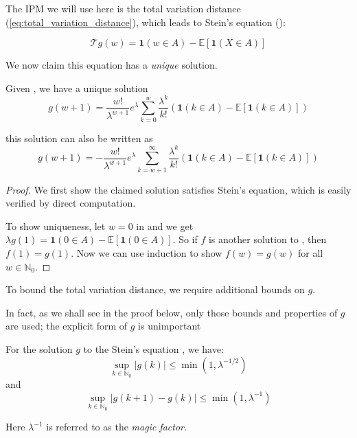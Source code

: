 \documentclass{article}
\begin{document}
The IPM we will use here is the total variation distance (\ref{eq:total_variation_distance}), which leads to Stein's equation ():

\begin{equation}
    \mathcal{T}g(w) = \mathbf{1}(w \in A) - \mathbb{E}[\mathbf{1}(X \in A)]
    \label{eq:poisson_stein_equation}
\end{equation}

We now claim this equation has a \textit{unique} solution.

\begin{lemma}\label{lem:poisson_stein_equation}
    Given , we have a unique solution
    \begin{equation}
        g(w+1) = \frac{w!}{\lambda^{w+1}} e^\lambda \sum_{k=0}^w \frac{\lambda^k}{k!} (\mathbf{1}(k\in A) - \mathbb{E}[\mathbf{1}(k\in A)])
    \end{equation}

    this solution can also be written as 
    \begin{equation}
        g(w+1) = -\frac{w!}{\lambda^{w+1}} e^\lambda \sum_{k=w+1}^\infty \frac{\lambda^k}{k!} (\mathbf{1}(k\in A) - \mathbb{E}[\mathbf{1}(k\in A)])
    \end{equation}
\end{lemma}

\begin{proof}
    We first show the claimed solution satisfies Stein's equation, which is easily verified by direct computation.  
    
    To show uniqueness, let $w=0$ in  and we get $\lambda g(1) = \mathbf{1}(0\in A) - \mathbb{E}[\mathbf{1}(0\in A)]$. So if $f$ is another solution to , then $f(1)=g(1)$. Now we can use induction to show $f(w)=g(w)$ for all $w\in \mathbb{N}_0$.
\end{proof}

To bound the total variation distance, we require additional bounds on $g$.  
\begin{remark}
    In fact, as we shall see in the proof below, only those bounds and properties of $g$ are used; the explicit form of $g$ is unimportant
\end{remark}

\begin{lemma}\label{lem:poisson_stein_bound}
For the solution $g$ to the Stein's equation , we have:
\begin{equation}
    \sup_{k \in \mathbb{N}_0} |g(k)| \leq \min (1, \lambda^{-1/2})
    \label{eq:poisson_stein_bound1}
\end{equation}
and 
\begin{equation}
    \sup_{k \in \mathbb{N}_0} |g(k+1) - g(k)| \leq \min (1, \lambda^{-1})
    \label{eq:poisson_stein_bound2}
\end{equation}

Here $\lambda^{-1}$ is referred to as the \textit{magic factor}.
\end{lemma}
\end{document}
